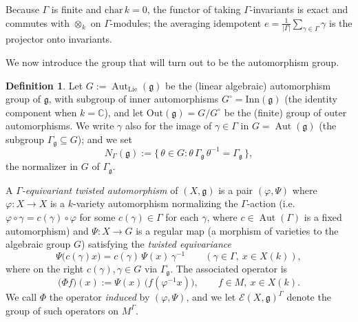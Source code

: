 \documentclass{amsart}
\theoremstyle{definition}
\newtheorem{definition}{Definition}
\DeclareMathOperator{\Aut}{Aut}
\newcommand{\g}{\mathfrak{g}}
\newcommand{\C}{\mathbb{C}}
\newcommand{\M}{M}
\begin{document}
Because $\Gamma$ is finite and $\mathrm{char}\,k=0$, the functor of taking
$\Gamma$-invariants is exact and commutes with $\otimes_k$ on
$\Gamma$-modules; the averaging idempotent
$e=\frac1{|\Gamma|}\sum_{\gamma\in\Gamma}\gamma$ is the projector onto
invariants.

\medskip
We now introduce the group that will turn out to be the automorphism
group.

\begin{definition}\label{def:emap}
Let $G:=\Aut_{\mathrm{Lie}}(\g)$ be the (linear algebraic) automorphism
group of $\g$, with subgroup of inner automorphisms $G^\circ=\mathrm{Inn}(\g)$
(the identity component when $k=\C$), and let
$\mathrm{Out}(\g)=G/G^\circ$ be the (finite) group of outer
automorphisms.  We write $\gamma$ also for the image of $\gamma\in\Gamma$ in
$G=\Aut(\g)$ (the subgroup $\Gamma_\g\subseteq G$); and we set
\[
N_\Gamma(\g):=\{\,\theta\in G:
\theta\,\Gamma_\g\,\theta^{-1}=\Gamma_\g\,\},
\]
the normalizer in $G$ of $\Gamma_\g$.

A \emph{$\Gamma$-equivariant twisted automorphism} of $(X,\g)$ is a pair
$(\varphi,\Psi)$ where $\varphi\colon X\to X$ is a $k$-variety
automorphism normalizing the $\Gamma$-action (i.e.\ $\varphi\circ\gamma=
c(\gamma)\circ\varphi$ for some $c(\gamma)\in\Gamma$ for each
$\gamma$, where $c\in\Aut(\Gamma)$ is a fixed automorphism) and
$\Psi\colon X\to G$ is a regular map (a morphism of varieties to the
algebraic group $G$) satisfying the \emph{twisted equivariance}
\begin{equation}\label{eq:equivdef}
\Psi\bigl(c(\gamma)x\bigr)=c(\gamma)\,\Psi(x)\,\gamma^{-1}
\qquad(\gamma\in\Gamma,\ x\in X(k)),
\end{equation}
where on the right $c(\gamma),\gamma\in G$ via $\Gamma_\g$.  The associated
operator is
\begin{equation}\label{eq:Phi}
\bigl(\Phi f\bigr)(x):=\Psi(x)\,\bigl(f(\varphi^{-1}x)\bigr),
\qquad f\in\M,\ x\in X(k).
\end{equation}
We call $\Phi$ the operator \emph{induced} by $(\varphi,\Psi)$, and we let
$\mathcal{E}(X,\g)^\Gamma$ denote the group of such operators on
$\M^\Gamma$.


\end{definition}
\end{document}
